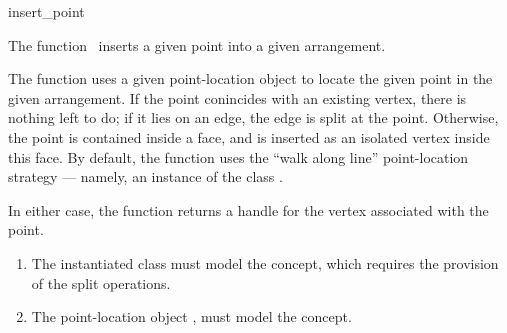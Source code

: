 \ccRefPageBegin

\begin{ccRefFunction}{insert_point}

\ccDefinition

The function \ccRefName\ inserts a given point into a given arrangement.

The function uses a given point-location object to locate the given
point in the given arrangement. If the point conincides with an existing
vertex, there is nothing left to do; if it lies on an edge, the edge is
split at the point. Otherwise, the point is contained inside a face, and is
inserted as an isolated vertex inside this face.
By default, the function uses the ``walk along line'' point-location
strategy --- namely, an instance of the class
.

In either case, the function returns a handle for the vertex associated
with the point.



\begin{enumerate}
\item The instantiated  class must model the
   concept, which requires the provision
  of the split operations.
\item The point-location object , must model the
   concept.
\end{enumerate}

\end{ccRefFunction}

\ccRefPageEnd
